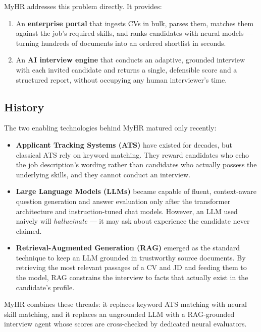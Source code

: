 \documentclass[12pt,a4paper,oneside]{report}
\begin{document}
MyHR addresses this problem directly. It provides:

\begin{enumerate}
  \item An \textbf{enterprise portal} that ingests CVs in bulk, parses them, matches them
    against the job's required skills, and ranks candidates with neural models --- turning
    hundreds of documents into an ordered shortlist in seconds.
  \item An \textbf{AI interview engine} that conducts an adaptive, grounded interview with
    each invited candidate and returns a single, defensible score and a structured report,
    without occupying any human interviewer's time.
\end{enumerate}

\subsection{History}

The two enabling technologies behind MyHR matured only recently:

\begin{itemize}
  \item \textbf{Applicant Tracking Systems (ATS)} have existed for decades, but classical ATS
    rely on keyword matching. They reward candidates who echo the job description's wording
    rather than candidates who actually possess the underlying skills, and they cannot conduct
    an interview.
  \item \textbf{Large Language Models (LLMs)} became capable of fluent, context-aware question
    generation and answer evaluation only after the transformer architecture and
    instruction-tuned chat models. However, an LLM used naively will \textit{hallucinate} ---
    it may ask about experience the candidate never claimed.
  \item \textbf{Retrieval-Augmented Generation (RAG)} emerged as the standard technique to
    keep an LLM grounded in trustworthy source documents. By retrieving the most relevant
    passages of a CV and JD and feeding them to the model, RAG constrains the interview to
    facts that actually exist in the candidate's profile.
\end{itemize}

MyHR combines these threads: it replaces keyword ATS matching with neural skill matching, and
it replaces an ungrounded LLM with a RAG-grounded interview agent whose scores are
cross-checked by dedicated neural evaluators.
\end{document}
